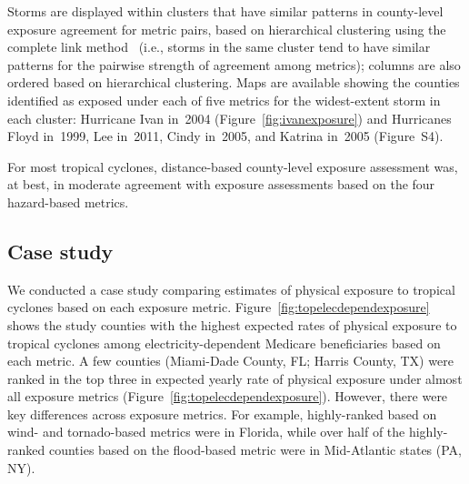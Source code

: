 Storms are displayed within
clusters that have similar patterns in county-level exposure agreement for
metric pairs, based on hierarchical clustering using the complete link
method~\parencite{murtagh2012algorithms} (i.e., storms in the same cluster tend
to have similar patterns for the pairwise strength of agreement among metrics);
columns are also ordered based on hierarchical clustering. 
Maps are
available showing the counties identified as exposed under each of five metrics
for the widest-extent storm in each cluster: Hurricane Ivan in~2004
(Figure~\ref{fig:ivanexposure}) and Hurricanes Floyd in~1999, Lee in~2011, Cindy
in~2005, and Katrina in~2005 (Figure~S4).

For most tropical cyclones,
distance-based county-level exposure assessment was, at best, in moderate
agreement with exposure assessments based on the four hazard-based metrics.

\subsection*{Case study}

We conducted a case study comparing estimates of physical exposure to tropical
cyclones based on each exposure metric.  Figure~\ref{fig:topelecdependexposure}
shows the study counties with the highest expected rates of physical exposure
to tropical cyclones among electricity-dependent Medicare beneficiaries based
on each metric. A few counties (Miami-Dade County, FL; Harris County, TX) were
ranked in the top three in expected yearly rate of physical exposure under
almost all exposure metrics (Figure~\ref{fig:topelecdependexposure}). However,
there were key differences across exposure metrics. For example, highly-ranked
based on wind- and tornado-based metrics were in Florida, while over half of
the highly-ranked counties based on the flood-based metric were in Mid-Atlantic
states (PA, NY).


